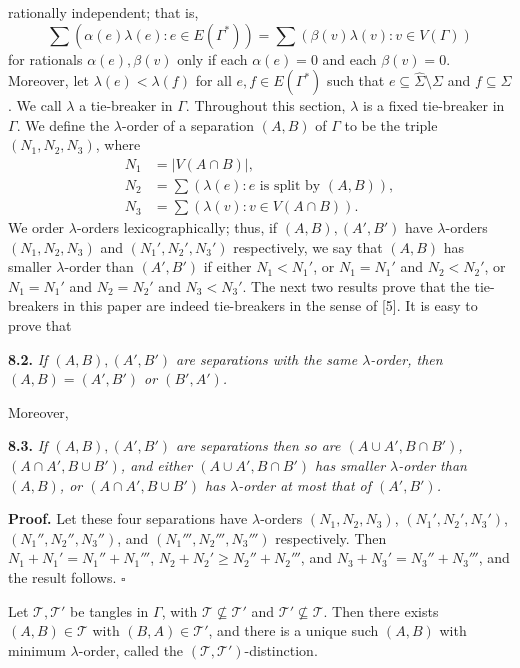 \noindent rationally independent; that is,
\begin{equation*}
\sum (\alpha(e)\lambda(e) : e \in E(\Gamma^*)) = \sum (\beta(v)\lambda(v) : v \in V(\Gamma))
\end{equation*}
for rationals $\alpha(e), \beta(v)$ only if each $\alpha(e) = 0$ and each $\beta(v) = 0$. Moreover, let $\lambda(e) < \lambda(f)$ for all $e, f \in E(\Gamma^*)$ such that $e \subseteq \hat{\Sigma} \setminus \Sigma$ and $f \subseteq \Sigma$. We call $\lambda$ a tie-breaker in $\Gamma$. Throughout this section, $\lambda$ is a fixed tie-breaker in $\Gamma$. We define the $\lambda$-order of a separation $(A, B)$ of $\Gamma$ to be the triple $(N_1, N_2, N_3)$, where
\begin{align*}
N_1 &= |V(A \cap B)|, \\
N_2 &= \sum (\lambda(e) : e \text{ is split by } (A, B)), \\
N_3 &= \sum (\lambda(v) : v \in V(A \cap B)).
\end{align*}
We order $\lambda$-orders lexicographically; thus, if $(A, B), (A', B')$ have $\lambda$-orders $(N_1, N_2, N_3)$ and $(N_1', N_2', N_3')$ respectively, we say that $(A, B)$ has smaller $\lambda$-order than $(A', B')$ if either $N_1 < N_1'$, or $N_1 = N_1'$ and $N_2 < N_2'$, or $N_1 = N_1'$ and $N_2 = N_2'$ and $N_3 < N_3'$. The next two results prove that the tie-breakers in this paper are indeed tie-breakers in the sense of [5]. It is easy to prove that

\textbf{8.2.} \textit{If $(A, B), (A', B')$ are separations with the same $\lambda$-order, then $(A, B) = (A', B')$ or $(B', A')$.}

Moreover,

\textbf{8.3.} \textit{If $(A, B), (A', B')$ are separations then so are $(A \cup A', B \cap B')$, $(A \cap A', B \cup B')$, and either $(A \cup A', B \cap B')$ has smaller $\lambda$-order than $(A, B)$, or $(A \cap A', B \cup B')$ has $\lambda$-order at most that of $(A', B')$.}

\textbf{Proof.} Let these four separations have $\lambda$-orders $(N_1, N_2, N_3)$, $(N_1', N_2', N_3')$, $(N_1'', N_2'', N_3'')$, and $(N_1''', N_2''', N_3''')$ respectively. Then $N_1 + N_1' = N_1'' + N_1'''$, $N_2 + N_2' \ge N_2'' + N_2'''$, and $N_3 + N_3' = N_3'' + N_3'''$, and the result follows. $\square$

Let $\mathscr{T}, \mathscr{T}'$ be tangles in $\Gamma$, with $\mathscr{T} \nsubseteq \mathscr{T}'$ and $\mathscr{T}' \nsubseteq \mathscr{T}$. Then there exists $(A, B) \in \mathscr{T}$ with $(B, A) \in \mathscr{T}'$, and there is a unique such $(A, B)$ with minimum $\lambda$-order, called the $(\mathscr{T}, \mathscr{T}')$-distinction.

